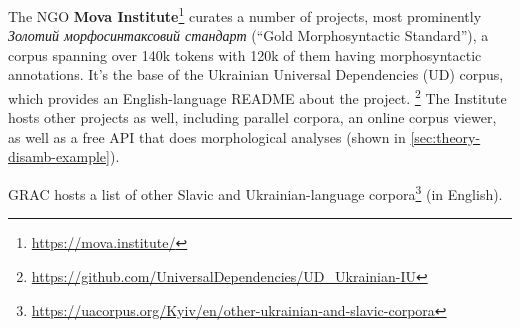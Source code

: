 The NGO \textbf{Mova Institute}\footnote{\href{https://mova.institute/}{https://mova.institute/}} curates a number of projects, most prominently \textit{Золотий морфосинтаксовий стандарт} (\enquote{Gold Morphosyntactic Standard}), a corpus spanning over 140k tokens with 120k of them having 
morphosyntactic annotations. 
It's the base of the Ukrainian Universal Dependencies (UD) corpus, which provides an English-language README about the project.%
\footnote{\href{https://github.com/UniversalDependencies/UD_Ukrainian-IU}{https://github.com/UniversalDependencies/UD\_Ukrainian-IU}}
The Institute hosts other projects as well, including parallel corpora, an online corpus viewer, as well as a free API that does morphological analyses (shown in \autoref{sec:theory-disamb-example}).

GRAC hosts a list of other Slavic and Ukrainian-language corpora\footnote{\href{https://uacorpus.org/Kyiv/en/other-ukrainian-and-slavic-corpora}{https://uacorpus.org/Kyiv/en/other-ukrainian-and-slavic-corpora}} (in English).


